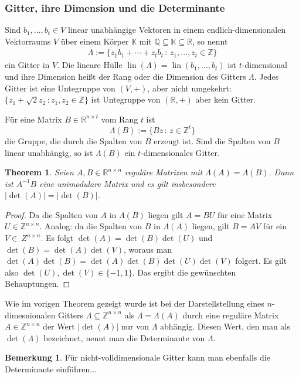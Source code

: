 \documentclass[
a4paper,landscape,16pt,
bibliography=totocnumbered,
numbers=noenddot,
]{scrartcl}
\numberwithin{equation}{subsection}
\newcommand{\Z}{\mathbb Z}
\newcommand{\Q}{\mathbb Q}
\newcommand{\R}{\mathbb R}
\newcommand{\K}{\mathbb K}
\newcommand{\lin}{\operatorname{lin}} %
\theoremstyle{plain}
\newtheorem*{thm}{Theorem}
\theoremstyle{definition}
\newtheorem*{bem}{Bemerkung}
\begin{document}
\subsubsection{Gitter, ihre Dimension und die Determinante} 

Sind $b_1,\ldots,b_t \in V$ linear unabhängige Vektoren in einem endlich-dimensionalen Vektorraums $V$ über einem Körper $\K$ mit $\Q \subseteq \K \subseteq \R$, so nennt 
\begin{align*}
		\Lambda := \{ z_1 b_1 + \cdots + z_t b_t \,: \, z_1,\ldots,z_t \in \Z \} 
\end{align*}
ein Gitter in $V$. Die lineare Hülle $\lin(\Lambda) = \lin(b_1,\ldots,b_t)$ ist $t$-dimensional  und ihre Dimension heißt der Rang oder die Dimension des Gitters $\Lambda$. 
Jedes Gitter ist eine Untegruppe von $(V,+)$, aber nicht umgekehrt: $\{ z_1 + \sqrt{2} z_2 \, :  z_1,z_2 \in \Z\}$ ist Untegruppe von $(\R,+)$ aber kein Gitter.

Für eine Matrix $B \in \R^{n \times t}$ vom Rang $t$ ist 
\[
	\Lambda(B) := \{ B z \,: \, z \in \Z^t \}
\]
die Gruppe, die durch die Spalten von $B$ erzeugt ist. Sind die Spalten von $B$ linear unabhängig, so ist $\Lambda(B)$ ein $t$-dimensionales Gitter. 

\begin{thm}
	Seien $A, B \in \R^{n \times n}$ reguläre Matrizen mit $\Lambda(A) = \Lambda(B)$. Dann ist $A^{-1} B$ eine unimodulare Matrix und es gilt insbesondere $|\det(A)| = |\det(B)|$.
\end{thm} 
\begin{proof}
	Da die Spalten von $A$ in $\Lambda(B)$ liegen gilt $A = B U$ für eine Matrix $U \in \Z^{n \times n}$. Analog: da die Spalten von $B$ in $\Lambda(A)$ liegen, gilt $B = A V$ für ein $V \in \ Z^{n \times n}$. Es folgt $\det(A) = \det(B) \det(U)$ und $\det(B) = \det(A) \det(V)$, woraus man $\det(A)\det(B) = \det(A) \det(B) \det(U)\det(V)$ folgert. Es gilt also $\det(U), \det(V) \in \{-1,1\}$. Das ergibt die gewünschten Behauptungen. 
\end{proof} 

Wie im vorigen Theorem gezeigt wurde ist bei der Darstellstellung eines $n$-dimesnionalen Gitters $\Lambda \subseteq  \Z^{n \times n}$ als $\Lambda = \Lambda(A)$ durch eine reguläre Matrix $A \in \Z^{n \times n}$ der Wert $|\det(A)|$ nur von $\Lambda$ abhängig. Diesen Wert, den man als $\det(\Lambda)$ bezeichnet,  nennt man die Determinante von $\Lambda$.

\begin{bem}
	Für nicht-volldimensionale Gitter kann man ebenfalls die Determinante einführen...
\end{bem} 
\end{document}
